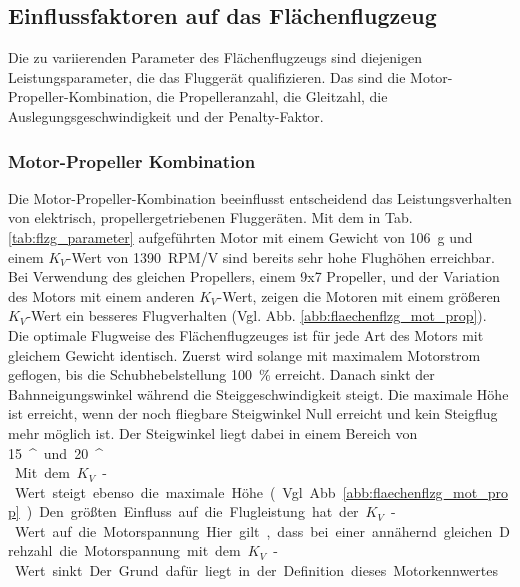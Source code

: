 

\subsection{Einflussfaktoren auf das Flächenflugzeug}
Die zu variierenden Parameter des Flächenflugzeugs sind diejenigen Leistungsparameter, die das Fluggerät qualifizieren. Das sind die Motor-Propeller-Kombination, die Propelleranzahl, die Gleitzahl, die Auslegungsgeschwindigkeit und der Penalty-Faktor.

\subsubsection{Motor-Propeller Kombination}
\label{subsubsec:mot_prop_kombi}
Die Motor-Propeller-Kombination beeinflusst entscheidend das Leistungsverhalten von elektrisch, propellergetriebenen Fluggeräten. Mit dem in Tab. \ref{tab:flzg_parameter} aufgeführten Motor mit einem Gewicht von \SI{106}{g} und einem \ensuremath{K_V}-Wert von \SI{1390}{RPM/V} sind bereits sehr hohe Flughöhen erreichbar. Bei Verwendung des gleichen Propellers, einem 9x7 Propeller, und der Variation des Motors mit einem anderen \ensuremath{K_V}-Wert, zeigen die Motoren mit einem größeren \ensuremath{K_V}-Wert ein besseres Flugverhalten (Vgl. Abb. \ref{abb:flaechenflzg_mot_prop}).\\
Die optimale Flugweise des Flächenflugzeuges ist für jede Art des Motors mit gleichem Gewicht identisch. Zuerst wird solange mit maximalem Motorstrom geflogen, bis die Schubhebelstellung \SI{100}{\%} erreicht. Danach sinkt der Bahnneigungswinkel während die Steiggeschwindigkeit steigt. Die maximale Höhe ist erreicht, wenn der noch fliegbare Steigwinkel Null erreicht und kein Steigflug mehr möglich ist. Der Steigwinkel liegt dabei in einem Bereich von \SI{15}{^\circ} und \SI{20}{^\circ}. \\
Mit dem \ensuremath{K_V}-Wert steigt ebenso die maximale Höhe (Vgl. Abb. \ref{abb:flaechenflzg_mot_prop}). Den größten Einfluss auf die Flugleistung hat der \ensuremath{K_V}-Wert auf die Motorspannung. Hier gilt, dass bei einer annähernd gleichen Drehzahl die Motorspannung mit dem \ensuremath{K_V}-Wert sinkt. Der Grund dafür liegt in der Definition dieses Motorkennwertes.\\

